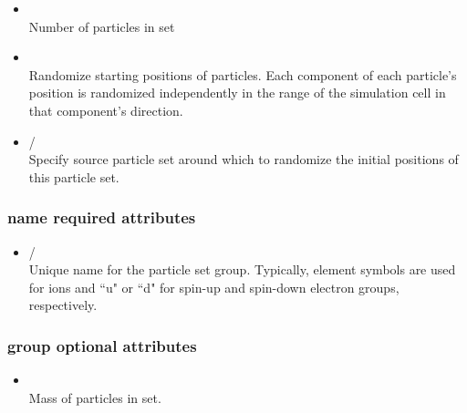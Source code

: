 \begin{itemize}
\item {} \\
Number of particles in set
\end{itemize}


\begin{itemize}
\item {} \\
Randomize starting positions of particles. Each component of each particle's position is randomized independently in the range of the simulation cell in that component's direction. 
\end{itemize}

\begin{itemize}
\item {}/ \\
Specify source particle set around which to randomize the initial positions of this particle set.
\end{itemize}

\subsubsection{name required attributes}

\begin{itemize}
\item {}/ \\
Unique name for the particle set group. Typically, element symbols are used for ions and ``u" or ``d" for spin-up and spin-down electron groups, respectively. 
\end{itemize}

\subsubsection{group optional attributes}

\begin{itemize}
\item {} \\
Mass of particles in set.
\end{itemize}

